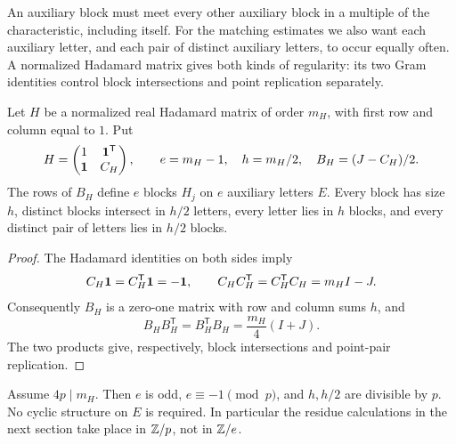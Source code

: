 An auxiliary block must meet every other auxiliary block in a multiple of the characteristic, including itself. For the matching estimates we also want each auxiliary letter, and each pair of distinct auxiliary letters, to occur equally often. A normalized Hadamard matrix gives both kinds of regularity: its two Gram identities control block intersections and point replication separately.
\begin{lemma}\label{lem:hadamard}
Let $H$ be a normalized real Hadamard matrix of order $m_H$, with first row and column equal to $1$. Put
\[
 H=\begin{pmatrix}1&\mathbf1^{\mathsf T}\\\mathbf1&C_H\end{pmatrix},
 \qquad e=m_H-1,\quad h=m_H/2,\quad B_H=(J-C_H)/2.
\]
The rows of $B_H$ define $e$ blocks $H_j$ on $e$ auxiliary letters $E$. Every block has size $h$, distinct blocks intersect in $h/2$ letters, every letter lies in $h$ blocks, and every distinct pair of letters lies in $h/2$ blocks.
\end{lemma}
\begin{proof}
The Hadamard identities on both sides imply
\[
 C_H\mathbf1=C_H^{\mathsf T}\mathbf1=-\mathbf1,
 \qquad C_HC_H^{\mathsf T}=C_H^{\mathsf T}C_H=m_HI-J.
\]
Consequently $B_H$ is a zero-one matrix with row and column sums $h$, and
\begin{equation}\label{eq:hadamard-gram}
 B_HB_H^{\mathsf T}=B_H^{\mathsf T}B_H=\frac{m_H}{4}(I+J).
\end{equation}
The two products give, respectively, block intersections and point-pair replication.
\end{proof}

Assume $4p\mid m_H$. Then $e$ is odd, $e\equiv-1\pmod p$, and $h,h/2$ are divisible by $p$. No cyclic structure on $E$ is required. In particular the residue calculations in the next section take place in $\mathbb Z/p$, not in $\mathbb Z/e$.

